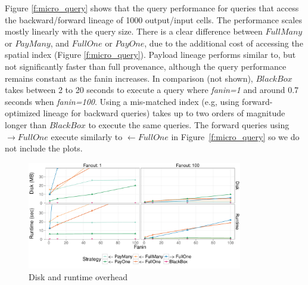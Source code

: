 Figure \ref{f:micro_query} shows that the query performance for queries that
access the backward/forward lineage of 1000 output/input cells.  The
performance scales mostly linearly with the query size.  There is a clear
difference between $FullMany$ or $PayMany$, and $FullOne$ or $PayOne$, due to
the additional cost of accessing the spatial index (Figure
\ref{f:micro_query}).  Payload lineage performs similar to, but not
significantly faster than full provenance, although the query performance
remains constant as the fanin increases.    In comparison (not shown),
$BlackBox$ takes between 2 to 20 seconds to execute a query where {\it fanin=1}
and around 0.7 seconds when {\it fanin=100}.  Using a mis-matched index (e.g,
using forward-optimized lineage for backward queries) takes up to two orders of
magnitude longer than $BlackBox$ to execute the same queries.  The forward
queries using $\rightarrow FullOne$ execute similarly to $\leftarrow FullOne$
in Figure~\ref{f:micro_query} so we do not include the plots.



\begin{figure}[ht]
    \includegraphics[width=3.7in,natwidth=10in,natheight=5in]{figures/microbench/overhead.pdf}
\vspace{-.2in}
\caption{Disk and runtime overhead}
\label{f:micro_overhead}
\end{figure}

